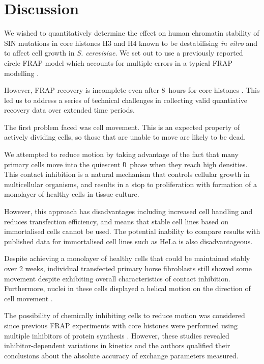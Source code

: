 \section{Discussion}

    We wished to quantitatively determine the effect on human chromatin stability
    of SIN mutations in core histones H3 and H4 known 
    to be destabilising \textit{in vitro} and to affect cell growth in \textit{S. cerevisiae}.
    We set out to use a previously reported circle FRAP model
    which accounts for multiple errors in a typical FRAP modelling .

    However, FRAP recovery is incomplete even after 8~hours for core histones \citep{KimuraCook}.
    This led us to address a series of technical challenges in
    collecting valid quantiative recovery data over extended time periods.


    The first problem faced was cell movement.
    This is an expected property of actively dividing cells, 
    so those that are unable to move are likely to be dead.

    We attempted to reduce motion by taking advantage of 
    the fact that many primary cells move into the quiescent \G0{}~phase when they reach high densities. 
    This contact inhibition is a natural mechanism that controls cellular growth in 
    multicellular organisms, and results in a stop to proliferation 
    with formation of a monolayer of healthy cells in tissue culture.

    However, this approach has disadvantages including 
    increased cell handling and reduces transfection efficiency,
    and means that stable cell lines based on immortalised cells cannot be used. 
    The potential inability to compare results with published data for 
    immortalised cell lines such as HeLa is also disadvantageous.

    Despite achieving a monolayer of healthy cells that could be maintained stably over 2 weeks,
    individual transfected primary horse fibroblasts still showed some movement
    despite exhibiting overall characteristics of contact inhibition.
    Furthermore, nuclei in these cells displayed a helical motion on the direction of cell movement .

    The possibility of chemically inhibiting cells to reduce motion was considered
    since previous FRAP experiments with core histones were performed using multiple inhibitors 
    of protein synthesis \citep{KimuraCook}. However, these studies revealed 
    inhibitor-dependent variations in kinetics and the authors qualified 
    their conclusions about the absolute accuracy of exchange parameters measured.

